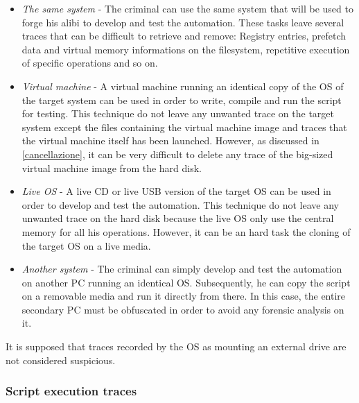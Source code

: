 \documentclass[runningheads,english]{llncs}
\begin{document}
\begin{itemize}
 \item \emph{The same system} - The criminal can use the same system that will be used to forge his alibi to develop and test the automation. These tasks leave several traces that can be difficult to retrieve and remove: Registry entries, prefetch data and virtual memory informations on the filesystem, repetitive execution of specific operations and so on.
 \item \emph{Virtual machine} - A virtual machine running an identical copy of the OS of the target system can be used in order to write, compile and run the script for testing. This technique do not leave any unwanted trace on the target system except the files containing the virtual machine image and traces that the virtual machine itself has been launched. However, as discussed in \ref{cancellazione}, it can be very difficult to delete any trace of the big-sized virtual machine image from the hard disk.
 \item \emph{Live OS} - A live CD or live USB version of the target OS can be used in order to develop and test the automation. This technique do not leave any unwanted trace on the hard disk because the live OS only use the central memory for all his operations. However, it can be an hard task the cloning of the target OS on a live media.
 \item \emph{Another system} - The criminal can simply develop and test the automation on another PC running an identical OS. Subsequently, he can copy the script on a removable media and run it directly from there. In this case, the entire secondary PC must be obfuscated in order to avoid any forensic analysis on it.
\end{itemize}

\noindent It is supposed that traces recorded by the OS as mounting an external drive are not considered suspicious.


\subsubsection{Script execution traces}
\label{subsub:extrac}

\end{document}
